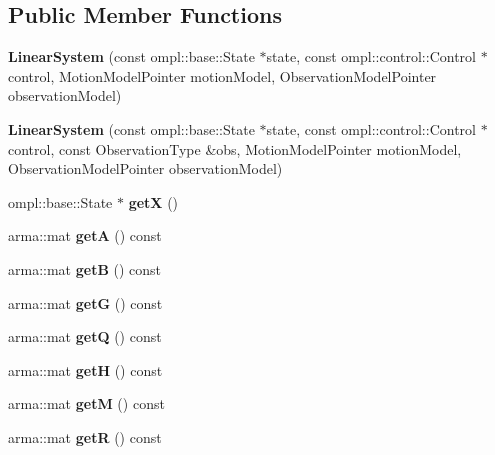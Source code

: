 \subsection*{\-Public \-Member \-Functions}
\begin{DoxyCompactItemize}
\item 
\hypertarget{class_linear_system_a6f05277076a4302dbcfa9646232871dc}{{\bfseries \-Linear\-System} (const ompl\-::base\-::\-State $\ast$state, const ompl\-::control\-::\-Control $\ast$control, \-Motion\-Model\-Pointer motion\-Model, \-Observation\-Model\-Pointer observation\-Model)}\label{class_linear_system_a6f05277076a4302dbcfa9646232871dc}

\item 
\hypertarget{class_linear_system_a428c800b858ed6c6d63230c64e470208}{{\bfseries \-Linear\-System} (const ompl\-::base\-::\-State $\ast$state, const ompl\-::control\-::\-Control $\ast$control, const \-Observation\-Type \&obs, \-Motion\-Model\-Pointer motion\-Model, \-Observation\-Model\-Pointer observation\-Model)}\label{class_linear_system_a428c800b858ed6c6d63230c64e470208}

\item 
\hypertarget{class_linear_system_a7d556441c0f68f6ccfdde32b72f888b6}{ompl\-::base\-::\-State $\ast$ {\bfseries get\-X} ()}\label{class_linear_system_a7d556441c0f68f6ccfdde32b72f888b6}

\item 
\hypertarget{class_linear_system_aa9b7cdb3f9e09902fbe9b1d65d932edb}{arma\-::mat {\bfseries get\-A} () const }\label{class_linear_system_aa9b7cdb3f9e09902fbe9b1d65d932edb}

\item 
\hypertarget{class_linear_system_af1a0b99cb2b4e30eb61b1bee328fb0bd}{arma\-::mat {\bfseries get\-B} () const }\label{class_linear_system_af1a0b99cb2b4e30eb61b1bee328fb0bd}

\item 
\hypertarget{class_linear_system_aaadd9d063ecdb4afb67ae4522cf921a7}{arma\-::mat {\bfseries get\-G} () const }\label{class_linear_system_aaadd9d063ecdb4afb67ae4522cf921a7}

\item 
\hypertarget{class_linear_system_ab95733398800308c2e69522d37f2a005}{arma\-::mat {\bfseries get\-Q} () const }\label{class_linear_system_ab95733398800308c2e69522d37f2a005}

\item 
\hypertarget{class_linear_system_a678fe164168013e7a4a4fc97e6716fa6}{arma\-::mat {\bfseries get\-H} () const }\label{class_linear_system_a678fe164168013e7a4a4fc97e6716fa6}

\item 
\hypertarget{class_linear_system_a4b69f2e4c7b6144c6abb8abf725ce063}{arma\-::mat {\bfseries get\-M} () const }\label{class_linear_system_a4b69f2e4c7b6144c6abb8abf725ce063}

\item 
\hypertarget{class_linear_system_aaad4f742dcb61f776d5de952977a745e}{arma\-::mat {\bfseries get\-R} () const }\label{class_linear_system_aaad4f742dcb61f776d5de952977a745e}

\end{DoxyCompactItemize}
